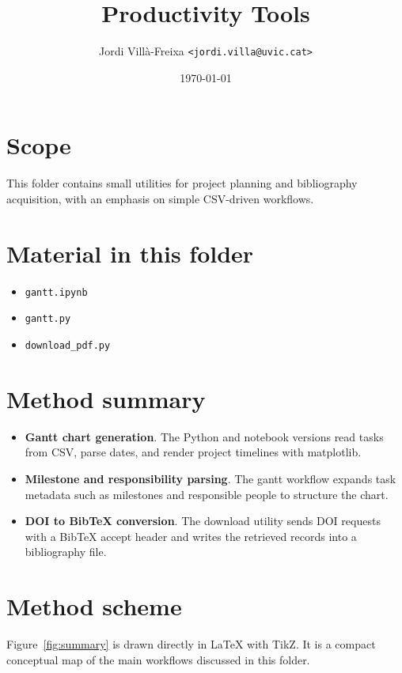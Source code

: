 \documentclass[11pt,a4paper]{article}
\title{Productivity Tools}
\author{Jordi Vill\`a-Freixa \texttt{<jordi.villa@uvic.cat>}}
\date{\today}
\begin{document}
    \maketitle

    \section*{Scope}
    This folder contains small utilities for project planning and bibliography acquisition, with an emphasis on simple CSV-driven workflows.

    \section*{Material in this folder}
    \begin{itemize}[leftmargin=*]
\item \texttt{gantt.ipynb}
\item \texttt{gantt.py}
\item \texttt{download\_pdf.py}
    \end{itemize}

    \section*{Method summary}
    \begin{itemize}[leftmargin=*]
\item \textbf{Gantt chart generation}. The Python and notebook versions read tasks from CSV, parse dates, and render project timelines with matplotlib.
\item \textbf{Milestone and responsibility parsing}. The gantt workflow expands task metadata such as milestones and responsible people to structure the chart.
\item \textbf{DOI to BibTeX conversion}. The download utility sends DOI requests with a BibTeX accept header and writes the retrieved records into a bibliography file.
    \end{itemize}

    \section*{Method scheme}
    Figure~\ref{fig:summary} is drawn directly in LaTeX with TikZ. It is a compact conceptual map of the main workflows discussed in this folder.
\end{document}
